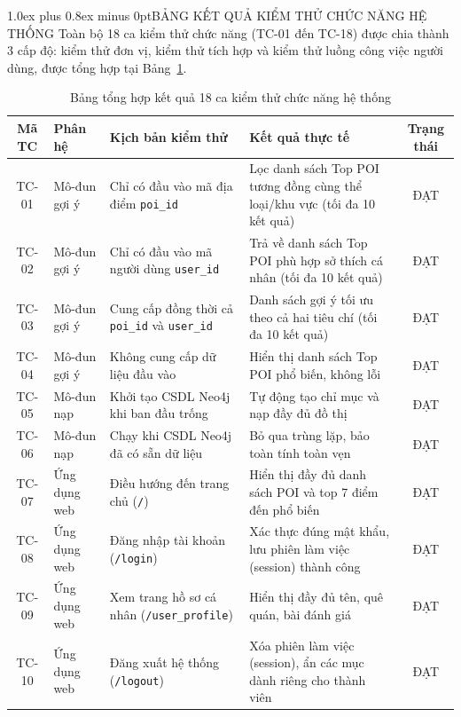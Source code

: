 \documentclass[journal,onecolumn,10pt]{IEEEtran}
\makeatletter
\newcommand{\code}[1]{\texttt{#1}}
\def\section{\@startsection{section}{1}{\z@}{2.2ex plus 1.2ex minus 0.4ex}%
{1.0ex plus 0.8ex minus 0pt}{\normalfont\normalsize\bfseries\centering}}
\makeatother
\begin{document}
\section{BẢNG KẾT QUẢ KIỂM THỬ CHỨC NĂNG HỆ THỐNG}
\label{sec:appendix_testcases}
Toàn bộ 18 ca kiểm thử chức năng (TC-01 đến TC-18) được chia thành 3 cấp độ: kiểm thử đơn vị, kiểm thử tích hợp và kiểm thử luồng công việc người dùng, được tổng hợp tại Bảng~\ref{tab:testcases}.

\begin{table}[H]
\centering
\caption{Bảng tổng hợp kết quả 18 ca kiểm thử chức năng hệ thống}
\label{tab:testcases}
\footnotesize
\setlength{\tabcolsep}{4pt}
\begin{tabular}{cp{2.2cm}p{4.6cm}p{5.8cm}c}
\toprule
\textbf{Mã TC} & \textbf{Phân hệ} & \textbf{Kịch bản kiểm thử} & \textbf{Kết quả thực tế} & \textbf{Trạng thái} \\
\midrule
TC-01 & Mô-đun gợi ý & Chỉ có đầu vào mã địa điểm \code{poi\_id} & Lọc danh sách Top POI tương đồng cùng thể loại/khu vực (tối đa 10 kết quả) & ĐẠT \\
TC-02 & Mô-đun gợi ý & Chỉ có đầu vào mã người dùng \code{user\_id} & Trả về danh sách Top POI phù hợp sở thích cá nhân (tối đa 10 kết quả) & ĐẠT \\
TC-03 & Mô-đun gợi ý & Cung cấp đồng thời cả \code{poi\_id} và \code{user\_id} & Danh sách gợi ý tối ưu theo cả hai tiêu chí (tối đa 10 kết quả) & ĐẠT \\
TC-04 & Mô-đun gợi ý & Không cung cấp dữ liệu đầu vào & Hiển thị danh sách Top POI phổ biến, không lỗi & ĐẠT \\
TC-05 & Mô-đun nạp & Khởi tạo CSDL Neo4j khi ban đầu trống & Tự động tạo chỉ mục và nạp đầy đủ đồ thị & ĐẠT \\
TC-06 & Mô-đun nạp & Chạy khi CSDL Neo4j đã có sẵn dữ liệu & Bỏ qua trùng lặp, bảo toàn tính toàn vẹn & ĐẠT \\
TC-07 & Ứng dụng web & Điều hướng đến trang chủ (\code{/}) & Hiển thị đầy đủ danh sách POI và top 7 điểm đến phổ biến & ĐẠT \\
TC-08 & Ứng dụng web & Đăng nhập tài khoản (\code{/login}) & Xác thực đúng mật khẩu, lưu phiên làm việc (session) thành công & ĐẠT \\
TC-09 & Ứng dụng web & Xem trang hồ sơ cá nhân (\code{/user\_profile}) & Hiển thị đầy đủ tên, quê quán, bài đánh giá & ĐẠT \\
TC-10 & Ứng dụng web & Đăng xuất hệ thống (\code{/logout}) & Xóa phiên làm việc (session), ẩn các mục dành riêng cho thành viên & ĐẠT \\

\end{tabular}
\end{table}
\end{document}
